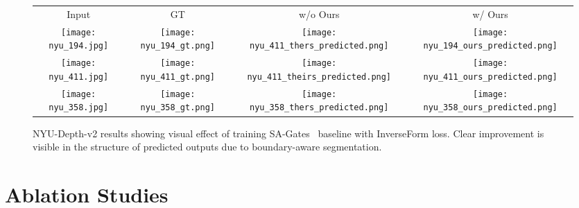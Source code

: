 \documentclass[final]{cvpr}
\begin{document}
\begin{figure}[t]
\center
\begin{tabularx}{\textwidth}{c c c c}
Input & GT & w/o Ours & w/ Ours \\
\hspace{-4mm}
\texttt{[image: nyu\_194.jpg]} \hspace{-4mm} &
\texttt{[image: nyu\_194\_gt.png]} \hspace{-4mm} &
\texttt{[image: nyu\_411\_thers\_predicted.png]} \hspace{-4mm} &
\texttt{[image: nyu\_194\_ours\_predicted.png]} \\
\hspace{-4mm}
\texttt{[image: nyu\_411.jpg]} \hspace{-4mm} &
\texttt{[image: nyu\_411\_gt.png]} \hspace{-4mm} &
\texttt{[image: nyu\_411\_theirs\_predicted.png]} \hspace{-4mm} &
\texttt{[image: nyu\_411\_ours\_predicted.png]} \\
\hspace{-4mm}
\texttt{[image: nyu\_358.jpg]} \hspace{-4mm} &
\texttt{[image: nyu\_358\_gt.png]} \hspace{-4mm} &
\texttt{[image: nyu\_358\_thers\_predicted.png]} \hspace{-4mm} &
\texttt{[image: nyu\_358\_ours\_predicted.png]} \\

\end{tabularx}
\caption{NYU-Depth-v2 results showing visual effect of training SA-Gates~\cite{chen2020bidirectional} baseline with InverseForm loss. Clear improvement is visible in the structure of predicted outputs due to boundary-aware segmentation.}\label{fig:nyu_result}\end{figure}


\section{Ablation Studies} \label{sec:ablation}
\end{document}
